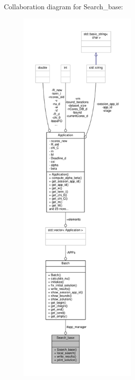 Collaboration diagram for Search\-\_\-base\-:
\nopagebreak
\begin{figure}[H]
\begin{center}
\leavevmode
\includegraphics[height=550pt]{classSearch__base__coll__graph}
\end{center}
\end{figure}

